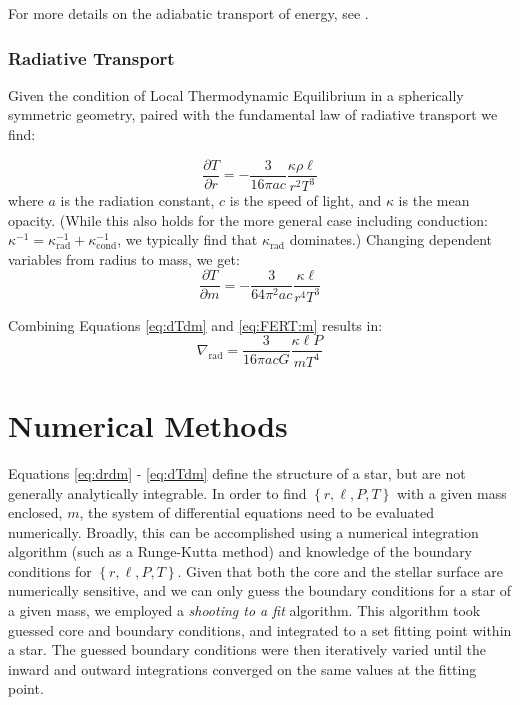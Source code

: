 For more details on the adiabatic transport of energy, see \citet[Section 4.3]{KippenhahnWeigertWeiss}. 

\subsubsection{Radiative Transport}
\label{sec:theory:transport:rad}
Given the condition of Local Thermodynamic Equilibrium in a spherically symmetric geometry, paired with the fundamental law of radiative transport we find:

\begin{equation}
  \frac{\partial T}{\partial r} = - \frac{3}{16 \pi a c } \frac{\kappa \rho \ell}{r^2 T^3}
  \label{eq:FERT:r}
\end{equation}
where $a$ is the radiation constant, $c$ is the speed of light, and $\kappa$ is the mean opacity. (While this also holds for the more general case including conduction: $\kappa^{-1} = \kappa_\mathrm{rad}^{-1} + \kappa_\mathrm{cond}^{-1}$, we typically find that $\kappa_\mathrm{rad}$ dominates.) Changing dependent variables from radius to mass, we get:
\begin{equation}
  \frac{\partial T}{\partial m} = - \frac{3}{64 \pi^2 a c } \frac{\kappa  \ell}{r^4 T^3}
  \label{eq:FERT:m}
\end{equation}

Combining Equations \ref{eq:dTdm} and \ref{eq:FERT:m} results in:
\begin{equation}
  \nabla_\mathrm{rad} = \frac{3}{16 \pi a c G} \frac{\kappa \ell P}{m T^4}
  \label{eq:del:rad}
\end{equation}



\section{Numerical Methods}
\label{sec:numerical}
Equations \ref{eq:drdm} - \ref{eq:dTdm} define the structure of a star, but are not generally analytically integrable.  In order to find $\left\{ r, \ell, P, T \right\}$ with a given mass enclosed, $m$, the system of differential equations need to be evaluated numerically.  Broadly, this can be accomplished using a numerical integration algorithm (such as a Runge-Kutta method) and knowledge of the boundary conditions for $\left\{ r, \ell, P, T \right\}$.  Given that both the core and the stellar surface are numerically sensitive, and we can only guess the boundary conditions for a star of a given mass, we employed a \emph{shooting to a fit} algorithm.  This algorithm took guessed core and boundary conditions, and integrated to a set fitting point within a star.  The guessed boundary conditions were then iteratively varied until the inward and outward integrations converged on the same values at the fitting point.

